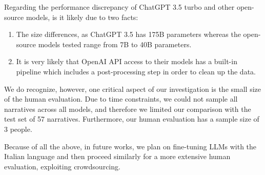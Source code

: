 Regarding the performance discrepancy of ChatGPT 3.5 turbo and other open-source models, is it likely due to two facts:
\begin{enumerate}
    \item The size differences, as ChatGPT 3.5 has 175B parameters \cite{} whereas the open-source models tested range from 7B to 40B parameters.
    \item It is very likely that OpenAI API access to their models has a built-in pipeline which includes a post-processing step in order to clean up the data.
\end{enumerate}

We do recognize, however, one critical aspect of our investigation is the small size of the human evaluation. Due to time constraints, we could not sample all narratives across all models, and therefore we limited our comparison with the test set of 57 narratives. Furthermore, our human evaluation has a sample size of 3 people. 

Because of all the above, in future works, we plan on fine-tuning LLMs with the Italian language and then proceed similarly for a more extensive human evaluation, exploiting crowdsourcing. 
